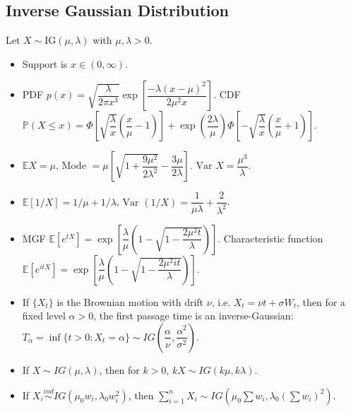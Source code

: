 \documentclass[twoside]{article}
\newcommand{\dis}{\displaystyle}
\newcommand\bbE{\mathbb{E}}
\newcommand\bbP{\mathbb{P}}
\newcommand\lmb{\lambda}
\newcommand\sg{\sigma}
\newcommand\var{\text{Var }}
\begin{document}
\subsection{Inverse Gaussian Distribution}
Let $X \sim \text{IG}(\mu, \lmb)$ with $\mu, \lmb > 0$.
\begin{itemize}
\item Support is $x \in (0, \infty)$.

\item PDF $p(x) = \sqrt{\dfrac{\lmb}{2\pi x^3}} \exp \left[\dfrac{-\lmb(x-\mu)^2}{2\mu^2 x} \right]$. CDF $\bbP(X \leq x) = \Phi \left[ \sqrt{\dfrac{\lmb}{x}}\left(\dfrac{x}{\mu} - 1 \right) \right] + \exp \left(\dfrac{2\lmb}{\mu}\right)\Phi \left[ -\sqrt{\dfrac{\lmb}{x}}\left(\dfrac{x}{\mu} + 1 \right) \right]$.

\item $\bbE X = \mu$, Mode $= \mu \left[\sqrt{1 + \dfrac{9\mu^2}{2\lmb^2}} - \dfrac{3\mu}{2\lmb} \right]$. $\var X = \dfrac{\mu^3}{\lmb}$.

\item $\bbE [1/X] = 1/\mu + 1/\lmb$, $\var (1/X) = \dfrac{1}{\mu\lmb} + \dfrac{2}{\lmb^2}$.

\item MGF $\bbE [e^{tX}] = \exp \left[\dfrac{\lmb}{\mu} \left(1 - \sqrt{1 - \dfrac{2\mu^2 t}{\lmb}} \right) \right]$. Characteristic function $\bbE [e^{itX}] = \exp \left[\dfrac{\lmb}{\mu} \left(1 - \sqrt{1 - \dfrac{2\mu^2 it}{\lmb}} \right) \right]$.

\item If $\{X_t \}$ is the Brownian motion with drift $\nu$, i.e. $X_t = \nu t + \sg W_t$, then for a fixed level $\alpha > 0$, the first passage time is an inverse-Gaussian: $T_\alpha = \inf\{t > 0: X_t = \alpha \} \sim IG \left(\dfrac{\alpha}{\nu}, \dfrac{\alpha^2}{\sg^2} \right)$.

\item If $X \sim IG(\mu, \lmb)$, then for $k > 0$, $kX \sim IG(k\mu, k\lmb)$.

\item If $X_i \stackrel{ind}{\sim} IG(\mu_0 w_i, \lmb_0 w_i^2)$, then $\dis\sum_{i=1}^n X_i \sim IG \left( \mu_0 \sum w_i, \lmb_0 \left( \sum w_i \right)^2 \right)$.

\end{itemize}

\end{document}
